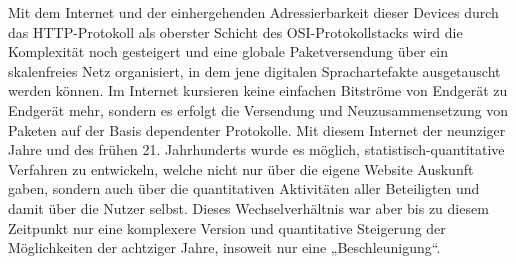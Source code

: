 \documentclass[12pt,a4paper]{article}
\begin{document}
Mit dem Internet und der einhergehenden Adressierbarkeit dieser Devices durch
das HTTP-Protokoll als oberster Schicht des OSI-Protokollstacks wird die
Komplexität noch gesteigert und eine globale Paketversendung über ein
skalenfreies Netz organisiert, in dem jene digitalen Sprachartefakte
ausgetauscht werden können. Im Internet kursieren keine einfachen Bitströme
von Endgerät zu Endgerät mehr, sondern es erfolgt die Versendung und
Neuzusammensetzung von Paketen auf der Basis dependenter Protokolle. Mit
diesem Internet der neunziger Jahre und des frühen 21. Jahrhunderts wurde es
möglich, statistisch-quantitative Verfahren zu entwickeln, welche nicht nur
über die eigene Website Auskunft gaben, sondern auch über die quantitativen
Aktivitäten aller Beteiligten und damit über die Nutzer selbst. Dieses
Wechselverhältnis war aber bis zu diesem Zeitpunkt nur eine komplexere Version
und quantitative Steigerung der Möglichkeiten der achtziger Jahre, insoweit
nur eine „Beschleunigung“.
\end{document}
